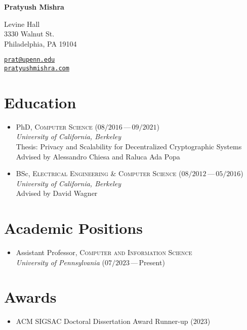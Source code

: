 \documentclass[10pt]{article}
\begin{document}
\begin{cv}{\vspace{-5em}}
    {\huge
    \textbf{Pratyush Mishra}}
  \vspace{1em}
  
  \begin{multicols}{2}
  Levine Hall\\
  3330 Walnut St.\\
  Philadelphia, PA 19104

  \href{mailto:prat@upenn.edu}{\texttt{prat@upenn.edu}}\\
  \href{http://www.pratyushmishra.com}{\texttt{pratyushmishra.com}}
  \end{multicols}

  \hfill
  

  {\section*{Education}}
  \begin{itemize}
    \item[] PhD, \textsc{Computer Science} (\small$08/2016$\,---\,$09/2021$)\\
    \emph{University of California, Berkeley}\\
    Thesis: Privacy and Scalability for Decentralized Cryptographic Systems \\
    Advised by Alessandro Chiesa and Raluca Ada Popa

  \item[] BSc, \textsc{Electrical Engineering \& Computer Science} (\small$08/2012$\,---\,$05/2016$)\\
  \emph{University of California, Berkeley}\\
    Advised by David Wagner
  \end{itemize}
  {\section*{Academic Positions}}
  \begin{itemize}
    \item[] Assistant Professor, \textsc{Computer and Information Science} \\
    \emph{University of Pennsylvania} (\small$07/2023$\,---\,Present)
  \end{itemize}
{\section*{Awards}}
  \begin{itemize}
    \item[] ACM SIGSAC Doctoral Dissertation Award Runner-up (\small$2023$)
  \end{itemize}



\end{cv}
\end{document}

